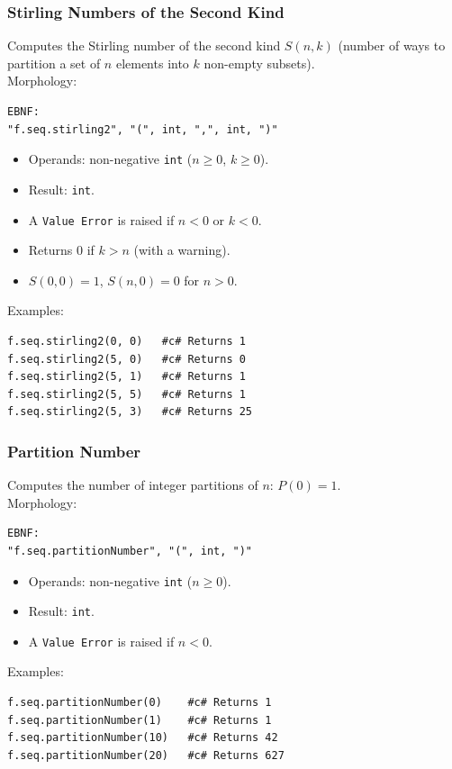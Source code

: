 \subsubsection{Stirling Numbers of the Second Kind}
Computes the Stirling number of the second kind $S(n,k)$ (number of ways to partition a set of $n$ elements into $k$ non-empty subsets).\\
Morphology:
\begin{verbatim}
EBNF:
"f.seq.stirling2", "(", int, ",", int, ")"
\end{verbatim}
\begin{itemize}
\item Operands: non-negative \texttt{int} ($n \geq 0$, $k \geq 0$).
\item Result: \texttt{int}.
\item A \texttt{Value Error} is raised if $n < 0$ or $k < 0$.
\item Returns 0 if $k > n$ (with a warning).
\item $S(0,0) = 1$, $S(n,0) = 0$ for $n > 0$.
\end{itemize}
Examples:
\begin{verbatim}
f.seq.stirling2(0, 0)   #c# Returns 1
f.seq.stirling2(5, 0)   #c# Returns 0
f.seq.stirling2(5, 1)   #c# Returns 1
f.seq.stirling2(5, 5)   #c# Returns 1
f.seq.stirling2(5, 3)   #c# Returns 25
\end{verbatim}

\subsubsection{Partition Number}
Computes the number of integer partitions of $n$: $P(0) = 1$.\\
Morphology:
\begin{verbatim}
EBNF:
"f.seq.partitionNumber", "(", int, ")"
\end{verbatim}
\begin{itemize}
\item Operands: non-negative \texttt{int} ($n \geq 0$).
\item Result: \texttt{int}.
\item A \texttt{Value Error} is raised if $n < 0$.
\end{itemize}
Examples:
\begin{verbatim}
f.seq.partitionNumber(0)    #c# Returns 1
f.seq.partitionNumber(1)    #c# Returns 1
f.seq.partitionNumber(10)   #c# Returns 42
f.seq.partitionNumber(20)   #c# Returns 627
\end{verbatim}

